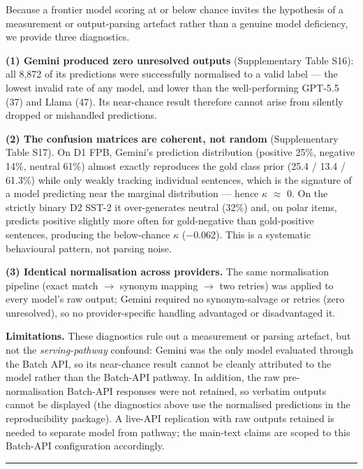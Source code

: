 \documentclass[11pt]{article}
\begin{document}
Because a frontier model scoring at or below chance invites the
hypothesis of a measurement or output-parsing artefact rather than a
genuine model deficiency, we provide three diagnostics.

\textbf{(1) Gemini produced zero unresolved outputs} (Supplementary
Table S16): all 8,872 of its predictions were successfully normalised to
a valid label --- the lowest invalid rate of any model, and lower than
the well-performing GPT-5.5 (37) and Llama (47). Its near-chance result
therefore cannot arise from silently dropped or mishandled predictions.

\textbf{(2) The confusion matrices are coherent, not random}
(Supplementary Table S17). On D1 FPB, Gemini's prediction distribution
(positive 25\%, negative 14\%, neutral 61\%) almost exactly reproduces
the gold class prior (25.4 / 13.4 / 61.3\%) while only weakly tracking
individual sentences, which is the signature of a model predicting near
the marginal distribution --- hence $\kappa$ $\approx$ 0. On the strictly binary D2
SST-2 it over-generates neutral (32\%) and, on polar items, predicts
positive slightly more often for gold-negative than gold-positive
sentences, producing the below-chance $\kappa$ ($-$0.062). This is a systematic
behavioural pattern, not parsing noise.

\textbf{(3) Identical normalisation across providers.} The same
normalisation pipeline (exact match $\rightarrow$ synonym mapping $\rightarrow$ two retries) was
applied to every model's raw output; Gemini required no synonym-salvage
or retries (zero unresolved), so no provider-specific handling
advantaged or disadvantaged it.

\textbf{Limitations.} These diagnostics rule out a measurement or
parsing artefact, but not the \emph{serving-pathway} confound: Gemini
was the only model evaluated through the Batch API, so its near-chance
result cannot be cleanly attributed to the model rather than the
Batch-API pathway. In addition, the raw pre-normalisation Batch-API
responses were not retained, so verbatim outputs cannot be displayed
(the diagnostics above use the normalised predictions in the
reproducibility package). A live-API replication with raw outputs
retained is needed to separate model from pathway; the main-text claims
are scoped to this Batch-API configuration accordingly.

\begin{center}\rule{0.5\linewidth}{0.5pt}\end{center}
\end{document}
